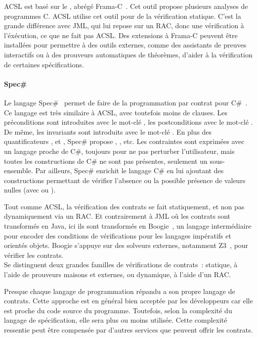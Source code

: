 ACSL est basé sur le , abrégé
Frama-C~. Cet outil propose plusieurs analyses de programmes C.
ACSL utilise cet outil pour de la vérification statique. C'est la grande
différence avec JML, qui lui repose sur un RAC, donc une vérification à
l'éxécution, ce que ne fait pas ACSL. Des extensions à Frama-C peuvent être
installées pour permettre à des outils externes, comme des assistants de preuves
interactifs ou à des prouveurs automatiques de théorèmes, d'aider à la
vérification de certaines spécifications.

\paragraph{Spec\#} Le langage Spec\#~ permet de faire de la
programmation par contrat pour C\#~. Ce langage est très similaire
à ACSL, avec toutefois moins de clauses. Les préconditions sont introduites avec
le mot-clé , les postconditions avec le mot-clé .
De même, les invariants sont introduits avec le mot-clé . En
plus des quantificateurs ,  et ,
Spec\# propose , ,  etc. Les contraintes sont
exprimées avec un langage proche de C\#, toujours pour ne pas perturber
l'utilisateur, mais toutes les constructions de C\# ne sont pas présentes,
seulement un sous-ensemble.  Par ailleurs, Spec\# enrichit le langage C\# en lui
ajoutant des constructions permettant de vérifier l'absence ou la possible
présence de valeurs nulles (avec \code{!} ou ).

Tout comme ACSL, la vérification des contrats se fait statiquement, et non pas
dynamiquement via un RAC. Et contrairement à JML où les contrats sont
transformés en Java, ici ils sont transformés en Boogie~,
un langage intermédiaire pour encoder des conditions de vérifications pour les
langages impératifs et orientés objets. Boogie s'appuye sur des solveurs
externes, notamment Z3~, pour vérifier les contrats. \\

Se distinguent deux grandes familles de vérifications de contrats~: statique, à
l'aide de prouveurs maisons et externes, ou dynamique, à l'aide d'un RAC.

Presque chaque langage de programmation répandu a son propre langage de
contrats. Cette approche est en général bien acceptée par les développeurs car
elle est proche du code source du programme. Toutefois, selon la complexité du
langage de spécification, elle sera plus ou moins utilisée. Cette complexité
ressentie peut être compensée par d'autres services que peuvent offrir les
contrats.

